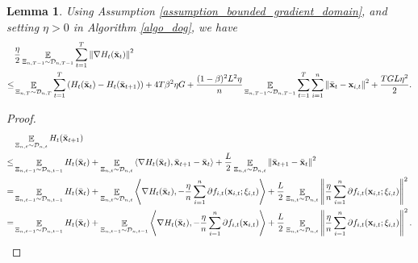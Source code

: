 \documentclass{article}
\newtheorem{Lemma}{\bf{Lemma}}
\begin{document}
\begin{Lemma}
\label{lemma_gradient_norm_bound}
Using Assumption \ref{assumption_bounded_gradient_domain}, and setting $\eta>0$ in Algorithm \ref{algo_dog}, we have 
\begin{align}
& \frac{\eta}{2} \mathop{\mathbb{E}}_{ \Xi_{n,T-1} \sim \mathcal{D}_{n,T-1} }\sum_{t=1}^T \left\lVert\nabla H_t(\bar{{\bf x}}_t)\right\rVert^2 \\ \nonumber
\le & \mathop{\mathbb{E}}_{ \Xi_{n,T} \sim \mathcal{D}_{n,T} } \sum_{t=1}^T  \left( H_t(\bar{{\bf x}}_t) - H_t(\bar{{\bf x}}_{t+1}) \right) + 4T\beta^2 \eta G + \frac{(1-\beta)^2L^2 \eta}{n}\mathop{\mathbb{E}}_{ \Xi_{n,T-1} \sim \mathcal{D}_{n,T-1} }\sum_{t=1}^T\sum_{i=1}^n \left\lVert \bar{{\bf x}}_t - {\bf x}_{i,t} \right\rVert^2 + \frac{TGL\eta^2}{2}.
\end{align}
\end{Lemma}
\begin{proof}

\begin{align}
\nonumber
& \mathop{\mathbb{E}}_{ \Xi_{n,t} \sim \mathcal{D}_{n,t} } H_t(\bar{{\bf x}}_{t+1}) \\ \nonumber
\le & \mathop{\mathbb{E}}_{ \Xi_{n,t-1} \sim \mathcal{D}_{n,t-1} } H_t(\bar{{\bf x}}_t) + \mathop{\mathbb{E}}_{ \Xi_{n,t} \sim \mathcal{D}_{n,t} }\left\langle\nabla H_t(\bar{{\bf x}}_t), \bar{{\bf x}}_{t+1} - \bar{{\bf x}}_t \right\rangle + \frac{L}{2}\mathop{\mathbb{E}}_{ \Xi_{n,t} \sim \mathcal{D}_{n,t} }\left\lVert\bar{{\bf x}}_{t+1} - \bar{{\bf x}}_t\right\rVert^2 \\ \nonumber
= & \mathop{\mathbb{E}}_{ \Xi_{n,t-1} \sim \mathcal{D}_{n,t-1} } H_t(\bar{{\bf x}}_t) + \mathop{\mathbb{E}}_{ \Xi_{n,t} \sim \mathcal{D}_{n,t} }\left\langle\nabla H_t(\bar{{\bf x}}_t), -\frac{\eta}{n}\sum_{i=1}^n \partial f_{i,t}({\bf x}_{i,t};\xi_{i,t}) \right\rangle + \frac{L}{2} \mathop{\mathbb{E}}_{ \Xi_{n,t} \sim \mathcal{D}_{n,t} }\left\lVert\frac{\eta}{n}\sum_{i=1}^n \partial f_{i,t}({\bf x}_{i,t};\xi_{i,t})\right\rVert^2 \\ \label{equa_lemma_gradient_norm_temp0}
= & \mathop{\mathbb{E}}_{ \Xi_{n,t-1} \sim \mathcal{D}_{n,t-1} } H_t(\bar{{\bf x}}_t) + \mathop{\mathbb{E}}_{ \Xi_{n,t-1} \sim \mathcal{D}_{n,t-1} }\left\langle\nabla H_t(\bar{{\bf x}}_t), -\frac{\eta}{n}\sum_{i=1}^n \partial f_{i,t}({\bf x}_{i,t}) \right\rangle + \frac{L}{2} \mathop{\mathbb{E}}_{ \Xi_{n,t} \sim \mathcal{D}_{n,t} }\left\lVert\frac{\eta}{n}\sum_{i=1}^n \partial f_{i,t}({\bf x}_{i,t};\xi_{i,t})\right\rVert^2.
\end{align}



\end{proof}
\end{document}
